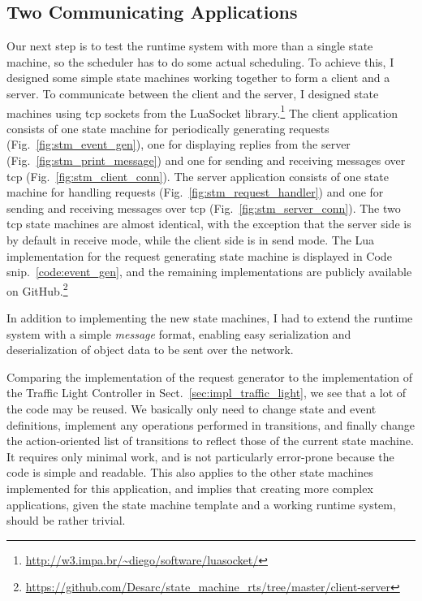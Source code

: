 \subsection{Two Communicating Applications}
\label{sec:client_server_app}
Our next step is to test the runtime system with more than a single state machine, so the scheduler has to do some actual scheduling. To achieve this, I designed some simple state machines working together to form a client and a server. To communicate between the client and the server, I designed state machines using \gls{tcp} sockets from the LuaSocket library.\footnote{\url{http://w3.impa.br/~diego/software/luasocket/}} The client application consists of one state machine for periodically generating requests (Fig.~\ref{fig:stm_event_gen}), one for displaying replies from the server (Fig.~\ref{fig:stm_print_message}) and one for sending and receiving messages over \gls{tcp} (Fig.~\ref{fig:stm_client_conn}). The server application consists of one state machine for handling requests (Fig.~\ref{fig:stm_request_handler}) and one for sending and receiving messages over \gls{tcp} (Fig.~\ref{fig:stm_server_conn}). The two \gls{tcp} state machines are almost identical, with the exception that the server side is by default in receive mode, while the client side is in send mode.
The Lua implementation for the request generating state machine is displayed in Code snip.~\ref{code:event_gen}, and the remaining implementations are publicly available on GitHub.\footnote{\url{https://github.com/Desarc/state_machine_rts/tree/master/client-server}}

\noindent
In addition to implementing the new state machines, I had to extend the runtime system with a simple \emph{message} format, enabling easy serialization and deserialization of object data to be sent over the network.

\noindent
Comparing the implementation of the request generator to the implementation of the Traffic Light Controller in Sect.~\ref{sec:impl_traffic_light}, we see that a lot of the code may be reused. We basically only need to change state and event definitions, implement any operations performed in transitions, and finally change the action-oriented list of transitions to reflect those of the current state machine. It requires only minimal work, and is not particularly error-prone because the code is simple and readable. This also applies to the other state machines implemented for this application, and implies that creating more complex applications, given the state machine template and a working runtime system, should be rather trivial.

